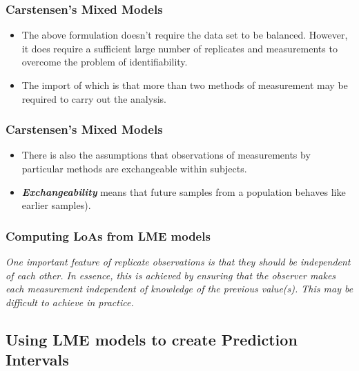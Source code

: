 \documentclass[compress]{beamer}        %
\begin{document}
\begin{frame}
\frametitle{Carstensen's Mixed Models}
\begin{itemize}
\item The above formulation doesn't require the data set to be balanced.
However, it does require a sufficient large number of replicates
and measurements to overcome the problem of identifiability. 
\item The
import of which is that more than two methods of measurement may
be required to carry out the analysis. 
\end{itemize}

\end{frame}
\begin{frame}
\frametitle{Carstensen's Mixed Models}
\begin{itemize}
\item There is also the
assumptions that observations of measurements by particular
methods are exchangeable within subjects. \item \textbf{\textit{Exchangeability}} means
that future samples from a population behaves like earlier
samples).
\end{itemize}
\end{frame}

\begin{frame}
\frametitle{Computing LoAs from LME models}
\emph{
One important feature of replicate observations is that they should be independent
of each other. In essence, this is achieved by ensuring that the observer makes each
measurement independent of knowledge of the previous value(s). This may be difficult
to achieve in practice.}
\end{frame}

\subsection*{Using LME models to create Prediction Intervals}
\end{document}
